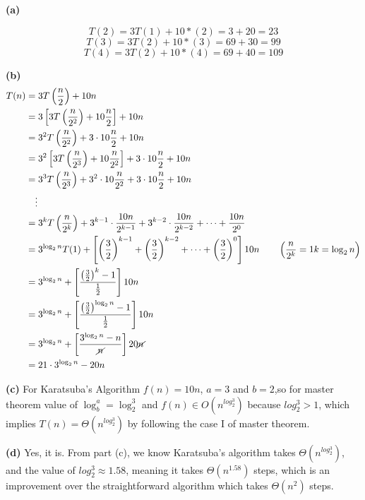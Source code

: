 \documentclass{article}
\begin{document}
\textbf{(a)}

\[T(2) = 3T(1) + 10*(2) = 3+20 = 23\]
\[T(3) = 3T(2) + 10*(3) = 69+30 = 99\]
\[T(4) = 3T(2) + 10*(4) = 69+40 = 109\]


\vspace{\baselineskip}
\noindent\textbf{(b)}
\[
\begin{aligned}
T(n) &= 3T\left(\frac{n}{2}\right) + 10n \\
&= 3\left[3T\left(\frac{n}{2^2}\right) + 10\frac{n}{2}\right] + 10n \\
&= 3^2 T\left(\frac{n}{2^2}\right) + 3 \cdot 10\frac{n}{2} + 10n \\
&= 3^2 \left[3T\left(\frac{n}{2^3}\right) + 10\frac{n}{2^2}\right] + 3 \cdot 10\frac{n}{2} + 10n \\
&= 3^3 T\left(\frac{n}{2^3}\right) + 3^2 \cdot 10\frac{n}{2^2} + 3 \cdot 10\frac{n}{2} + 10n \\
& \quad \vdots \\
&= 3^k T\left(\frac{n}{2^k}\right) + 3^{k-1} \cdot \frac{10n}{2^{k-1}} + 3^{k-2} \cdot \frac{10n}{2^{k-2}} + \dots + \frac{10n}{2^0} \\
&= 3^{\log_2 n} T(1) + \left[ \left(\frac{3}{2}\right)^{k-1} + \left(\frac{3}{2}\right)^{k-2} + \dots + \left(\frac{3}{2}\right)^0 \right] 10n \qquad \left(\frac{n}{2^k} = 1 k = \log_2 n \right) \\
&= 3^{\log_2 n} + \left[ \frac{\left(\frac{3}{2}\right)^k - 1}{\frac{1}{2}} \right] 10n \\
&= 3^{\log_2 n} + \left[ \frac{\left(\frac{3}{2}\right)^{\log_2 n} - 1}{\frac{1}{2}} \right] 10n \\
&= 3^{\log_2 n} + \left[ \frac{3^{\log_2 n} - n}{\cancel{n}} \right] 20\cancel{n} \\
&= 21 \cdot 3^{\log_2 n} - 20n
\end{aligned}
\]

\vspace{\baselineskip}
\noindent\textbf{(c)} For Karatsuba's Algorithm $f(n) = 10n$, $a = 3$ and $b = 2$,so for master theorem value of $\log_b^a = \log_2^3$ and $f(n) \in O(n^{log_2^3})$
because $log_2^3 > 1$, which implies $T(n) = \Theta(n^{log_2^3})$ by following the case I of master theorem.


\vspace{\baselineskip}
\noindent\textbf{(d)} Yes, it is. From part (c), we know Karatsuba's algorithm takes $\Theta(n^{log_2^3})$, and the value of $log_2^3 \approx 1.58$, meaning it
takes $\Theta(n^{1.58})$ steps, which is an improvement over the straightforward algorithm which takes $\Theta(n^2)$ steps.
\end{document}
